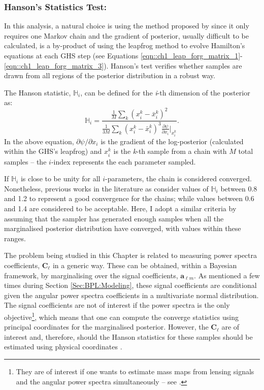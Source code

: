 \subsubsection{Hanson's Statistics Test:}
In this analysis, a natural choice is using the method proposed by \cite{Hanson2001} since it only requires one Markov chain and the gradient of posterior, usually difficult to be calculated, is a by-product of using the leapfrog method to evolve Hamilton's equations at each GHS step (see Equations \eqref{eqn::ch1_leap_forg_matrix_1}-\eqref{eqn::ch1_leap_forg_matrix_3}). Hanson's test verifies whether samples are drawn from all regions of the posterior distribution in a robust way. 

\qquad The Hanson statistic, $\mathbb{H}_i$, can be defined for the \textit{i}-th dimension of the posterior as:
\begin{equation}
 \mathbb{H}_i=\frac{\frac{1}{M}\sum_k\left(x_i^k-\bar{x}_i^k\right)^2}{ \frac{1}{3M}\sum_k\left(x_i^k-\bar{x}_i^k\right)^3\frac{\partial\psi}{\partial x_i}\Big|_{x_i^k} }.
 \end{equation}
In the above equation, $\partial\psi/\partial x_i$ is the gradient of the log-posterior (calculated within the GHS's leapfrog) and $x_i^k$ is the \textit{k}-th sample from a chain with $M$ total samples -- the $i$-index represents the each parameter sampled.

\qquad If $\mathbb{H}_i$ is close to be unity for all $i$-parameters, the chain is considered converged. Nonetheless, previous works in the literature as \cite{Taylor2008} consider values of $\mathbb{H}_i$ between 0.8 and 1.2 to represent a good convergence for the chains; while values between 0.6 and 1.4 are considered to be acceptable. Here, I adopt a similar criteria by assuming that the sampler has generated enough samples when all the marginalised posterior distribution have converged, with values within these ranges.

\qquad The problem being studied in this Chapter is related to measuring power spectra coefficients, $\bm{C}_{\ell}$ in a generic way. These can be obtained, within a Bayesian framework, by marginalising over the signal coefficients, $\bm{a}_{\ell m}$. As mentioned a few times during Section \ref{Sec:BPL:Modeling}, these signal coefficients are conditional given the angular power spectra coefficients in a multivariate normal distribution. The signal coefficients are not of interest if the power spectra is the only objective\footnote{They are of interest if one wants to estimate mass maps from lensing signals and the angular power spectra simultaneously -- see \cite{AlmostBlackPearl2016}.}, which means that one can compute the converge statistics using principal coordinates for the marginalised posterior. However, the $\bm{C}_{\ell}$ are of interest and, therefore, should the Hanson statistics for these samples should be estimated using physical coordinates \citep{SreeThesis}. 

